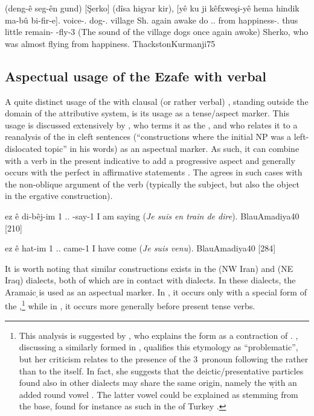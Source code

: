 {(deng-ê seg-ên gund) [Şerko] (dîsa hişyar kir), [yê ku ji kêfxweşi-yê hema hindik ma-bû bi-fir-e].}
{voice-\ez.\masc{} dog-\pl.\ez{} village Sh. again awake do \lnk.\ez.\masc{} \rel{} from happiness-\obl.\fem{} thus little remain-\prf{} \subj-fly-3\sg}
{(The sound of the village dogs once again awoke) Sherko, who was almost flying from happiness.}
{ThackstonKurmanji}{75}









\subsection{Aspectual usage of the Ezafe with verbal \secns} \label{ss:Kurd_ez_aspectual}

A quite distinct usage of the \lnk* \ez* with clausal (or rather verbal) \secns, standing outside the domain of the attributive system, is its usage as a tense/aspect marker. This usage is discussed extensively by \citet{HaigLinker}, who terms it as the , and who relates it to a reanalysis of the \ez* in cleft sentences (\enquote{constructions where the initial NP was a left-dislocated topic} in his words) as an aspectual marker. As such, it can combine with a verb in the present indicative to add a progressive aspect \citep[205]{MacKenzie} and generally occurs with the perfect in affirmative statements
 \citep[210]{MacKenzie}.  The \ez* agrees in such cases with the non-oblique argument of the verb (typically the subject, but also the object in the ergative construction).


{ez ê di-bêj-im}
{1\sg{} \lnk.\ez.\masc{} \ind-say-1\sg}
{I am saying (\textit{Je suis en train de dire}).}
{BlauAmadiya}{40 {[210]}}

{ez ê hat-im}
{1\sg{} \lnk.\ez.\masc{} came-1\sg}
{I have come (\textit{Je suis venu}).}
{BlauAmadiya}{40 {[284]}}

It is worth noting that similar constructions exists in the  \Sar (NW Iran) and \Ank (NE Iraq) dialects, both of which are in contact with \Kur dialects. In these   dialects, the Aramaic \d \lnk* is used as an aspectual marker. In \Sar, it occurs only with a special form of the ,\footnote{This analysis is suggested by \citet[138]{YounansardaroudSardarid}, who explains the form  as a contraction of . \citet[172]{NapiorkowskaDiyana}, discussing a similarly formed  in \Diy, qualifies this etymology as \enquote{problematic}, but her criticism relates to the presence of the 3\masc\ pronoun following the \lnk* rather than to the \lnk* itself. In fact, she suggests that the deictic/presentative particles  found also in other dialects may share the same origin, namely the \lnk* \d with an added round vowel . The latter vowel could be explained as stemming from the  base, found for instance as such in the  of Turkey \citep[see][310]{GutmanGaznax}.} while in \Ank, it occurs more generally before present tense verbs.


